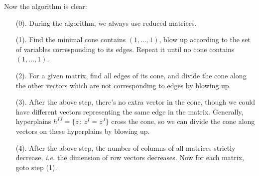 \documentclass[12pt]{article}
\theoremstyle{definition}
\theoremstyle{plain}
\begin{document}
Now the algorithm is clear:
\begin{enumerate}
	\item[(0).] During the algorithm, we always use reduced matrices.
	\item[(1).] Find the minimal cone contains $(1,\dots,1)$, blow up according to
		the set of variables corresponding to its edges. Repeat it until no cone 
		contains $(1,\dots,1)$.
	\item[(2).] For a given matrix, find all edges of its cone, and 
		divide the cone along the other vectors which are not corresponding to edges
		by blowing up.
	\item[(3).] After the above step, there's no extra vector in the cone, though we could have 
		different vectors representing the same edge in the matrix.
		Generally, hyperplains $h^{IJ}=\{z\,:\, z^I=z^J\}$ cross the cone, so we can 
		divide the cone along vectors on these hyperplains by blowing up. 
	\item[(4).] After the above step, the number of columns of all matrices strictly decrease,
		\textit{i.e.} the dimension of row vectors decreases.
		Now for each matrix, goto step (1).
\end{enumerate}
\end{document}

